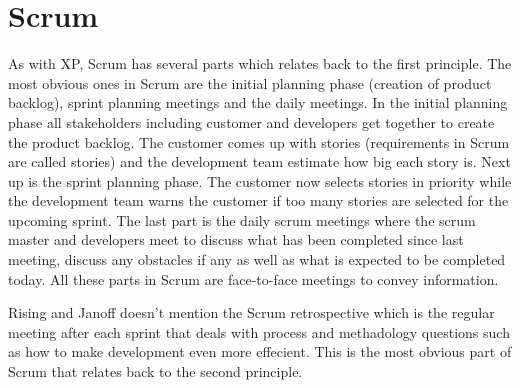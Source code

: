 \newpage
\section{Scrum}
As with XP, Scrum has several parts which relates back to the first principle.
The most obvious ones in Scrum are the initial planning phase (creation of
product backlog), sprint planning meetings and the daily meetings. In the
initial planning phase all stakeholders including customer and developers get
together to create the product backlog. The customer comes up with stories
(requirements in Scrum are called stories) and the development team estimate
how big each story is. Next up is the sprint planning phase. The customer now
selects stories in priority while the development team warns the customer if
too
many stories are selected for the upcoming sprint. The last part is the daily
scrum meetings where the scrum master and developers meet to discuss what
has been completed since last meeting, discuss any obstacles if any as well as
what is expected to be completed today. All these parts in Scrum are
face-to-face meetings to convey information.

Rising and Janoff \cite{rising00} doesn't mention the Scrum retrospective
\cite{web:scrumalliance-101} which is the regular
meeting after each sprint that deals with process and methadology questions
such as how to make development even more effecient. This is the most obvious
part of Scrum that relates back to the second principle.
